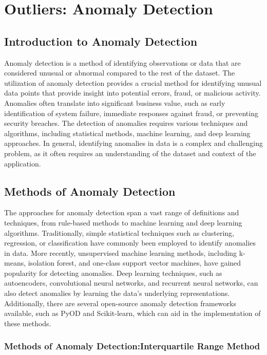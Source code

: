 \section{Outliers: Anomaly Detection}

\subsection{Introduction to Anomaly Detection}

Anomaly detection is a method of identifying observations or data that are considered unusual or abnormal compared to the rest of the dataset. The utilization of anomaly detection provides a crucial method for identifying unusual data points that provide insight into potential errors, fraud, or malicious activity. Anomalies often translate into significant business value, such as early identification of system failure, immediate responses against fraud, or preventing security breaches. The detection of anomalies requires various techniques and algorithms, including statistical methods, machine learning, and deep learning approaches. In general, identifying anomalies in data is a complex and challenging problem, as it often requires an understanding of the dataset and context of the application.

\subsection{Methods of Anomaly Detection}

The approaches for anomaly detection span a vast range of definitions and techniques, from rule-based methods to machine learning and deep learning algorithms. Traditionally, simple statistical techniques such as clustering, regression, or classification have commonly been employed to identify anomalies in data. More recently, unsupervised machine learning methods, including k-means, isolation forest, and one-class support vector machines, have gained popularity for detecting anomalies. Deep learning techniques, such as autoencoders, convolutional neural networks, and recurrent neural networks, can also detect anomalies by learning the data's underlying representations. Additionally, there are several open-source anomaly detection frameworks available, such as PyOD and Scikit-learn, which can aid in the implementation of these methods.

\subsubsection{Methods of Anomaly Detection:Interquartile Range Method}

